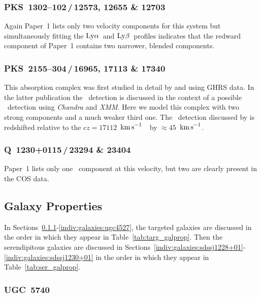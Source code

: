 \documentclass[twocolumn,twocolappendix,tighten,times]{aastex6}
\newcommand{\HI}{\ion{H}{1}}
\newcommand{\OVI}{\ion{O}{6}}
\newcommand{\OVIII}{\ion{O}{8}}
\newcommand{\kms}{\ensuremath{{\rm km\,s}^{-1}}}
\newcommand{\lya}{\ensuremath{{\rm Ly}\alpha}}
\newcommand{\lyb}{\ensuremath{{\rm Ly}\beta}}
\begin{document}
\subsubsection{PKS~1302--102\,/\,12573, 12655 \& 12703}
\label{indiv:absorbers:pks1302_12655}

Again Paper~1 lists only two velocity components for this system but  
simultaneously fitting the \lya\ and \lyb\ profiles indicates that
the redward component of Paper~1 contains two narrower, blended components.


\subsubsection{PKS~2155--304\,/\,16965, 17113 \& 17340}
\label{indiv:absorbers:pks2155_16964}

This absorption complex was first studied in detail by \citet{shull98} and 
\citet*{shull03} using GHRS data. In the latter publication the
\OVI\ detection is discussed in the context of a possible \OVIII\ detection 
using {\sl Chandra} and {\sl XMM}. Here we model this complex with two 
strong components and a much weaker third one. The \OVI\ detection discussed 
by \citet{shull03} is redshifted relative to the $cz= 17112$~\kms\ \HI\ by 
$\approx45$~\kms.


\subsubsection{Q~1230+0115\,/\,23294 \& 23404}
\label{indiv:absorbers:q1230_23404}

Paper~1 lists only one \HI\ component at this velocity, but two are clearly 
present in the COS data.




\subsection{Galaxy Properties}
\label{indiv:galaxies}

In Sections~\ref{indiv:galaxies:ugc5740}-\ref{indiv:galaxies:ugc4527}, the targeted 
galaxies are discussed in the order in which they appear in 
Table~\ref{tab:targ_galprop}. Then the serendipitous galaxies are discussed in 
Sections~\ref{indiv:galaxies:sdssj1228+01}-\ref{indiv:galaxies:sdssj1230+01} in the 
order in which they appear in Table~\ref{tab:ser_galprop}.


\subsubsection{UGC~5740}
\label{indiv:galaxies:ugc5740}
\end{document}
